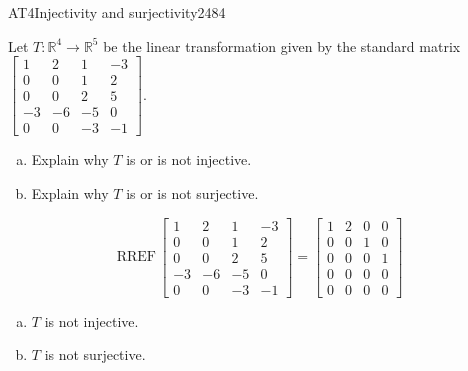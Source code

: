 \begin{exercise}{AT4}{Injectivity and surjectivity}{2484} 
\begin{exerciseStatement} 

 Let \(T:\mathbb{R}^4 \to \mathbb{R}^5\) be the linear transformation given by the standard matrix \(\left[\begin{array}{cccc}
1 & 2 & 1 & -3 \\
0 & 0 & 1 & 2 \\
0 & 0 & 2 & 5 \\
-3 & -6 & -5 & 0 \\
0 & 0 & -3 & -1
\end{array}\right]\). 

 

\begin{enumerate}[(a)]
\item 

Explain why \(T\) is or is not injective.


\item 

Explain why \(T\) is or is not surjective.


\end{enumerate}

     \end{exerciseStatement}
 \begin{exerciseAnswer} 

\[\mathrm{RREF}\,\left[\begin{array}{cccc}
1 & 2 & 1 & -3 \\
0 & 0 & 1 & 2 \\
0 & 0 & 2 & 5 \\
-3 & -6 & -5 & 0 \\
0 & 0 & -3 & -1
\end{array}\right]=\left[\begin{array}{cccc}
1 & 2 & 0 & 0 \\
0 & 0 & 1 & 0 \\
0 & 0 & 0 & 1 \\
0 & 0 & 0 & 0 \\
0 & 0 & 0 & 0
\end{array}\right]\]

 

\begin{enumerate}[(a)]
\item  

\(T\) is not injective.

 
\item  

\(T\) is not surjective.

 
\end{enumerate}

     \end{exerciseAnswer}
 \end{exercise}


